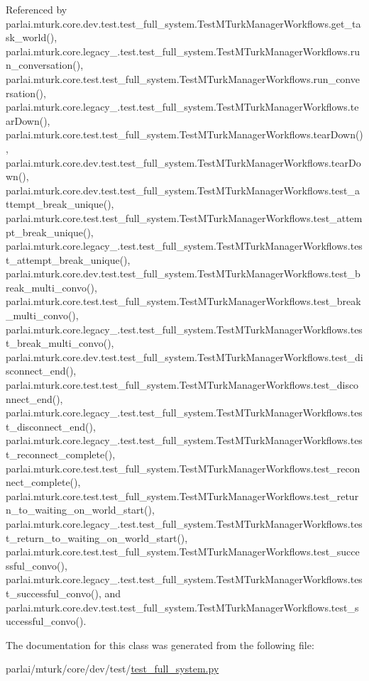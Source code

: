 Referenced by parlai.\+mturk.\+core.\+dev.\+test.\+test\+\_\+full\+\_\+system.\+Test\+M\+Turk\+Manager\+Workflows.\+get\+\_\+task\+\_\+world(), parlai.\+mturk.\+core.\+legacy\+\_.\+test.\+test\+\_\+full\+\_\+system.\+Test\+M\+Turk\+Manager\+Workflows.\+run\+\_\+conversation(), parlai.\+mturk.\+core.\+test.\+test\+\_\+full\+\_\+system.\+Test\+M\+Turk\+Manager\+Workflows.\+run\+\_\+conversation(), parlai.\+mturk.\+core.\+legacy\+\_.\+test.\+test\+\_\+full\+\_\+system.\+Test\+M\+Turk\+Manager\+Workflows.\+tear\+Down(), parlai.\+mturk.\+core.\+test.\+test\+\_\+full\+\_\+system.\+Test\+M\+Turk\+Manager\+Workflows.\+tear\+Down(), parlai.\+mturk.\+core.\+dev.\+test.\+test\+\_\+full\+\_\+system.\+Test\+M\+Turk\+Manager\+Workflows.\+tear\+Down(), parlai.\+mturk.\+core.\+dev.\+test.\+test\+\_\+full\+\_\+system.\+Test\+M\+Turk\+Manager\+Workflows.\+test\+\_\+attempt\+\_\+break\+\_\+unique(), parlai.\+mturk.\+core.\+test.\+test\+\_\+full\+\_\+system.\+Test\+M\+Turk\+Manager\+Workflows.\+test\+\_\+attempt\+\_\+break\+\_\+unique(), parlai.\+mturk.\+core.\+legacy\+\_.\+test.\+test\+\_\+full\+\_\+system.\+Test\+M\+Turk\+Manager\+Workflows.\+test\+\_\+attempt\+\_\+break\+\_\+unique(), parlai.\+mturk.\+core.\+dev.\+test.\+test\+\_\+full\+\_\+system.\+Test\+M\+Turk\+Manager\+Workflows.\+test\+\_\+break\+\_\+multi\+\_\+convo(), parlai.\+mturk.\+core.\+test.\+test\+\_\+full\+\_\+system.\+Test\+M\+Turk\+Manager\+Workflows.\+test\+\_\+break\+\_\+multi\+\_\+convo(), parlai.\+mturk.\+core.\+legacy\+\_.\+test.\+test\+\_\+full\+\_\+system.\+Test\+M\+Turk\+Manager\+Workflows.\+test\+\_\+break\+\_\+multi\+\_\+convo(), parlai.\+mturk.\+core.\+dev.\+test.\+test\+\_\+full\+\_\+system.\+Test\+M\+Turk\+Manager\+Workflows.\+test\+\_\+disconnect\+\_\+end(), parlai.\+mturk.\+core.\+test.\+test\+\_\+full\+\_\+system.\+Test\+M\+Turk\+Manager\+Workflows.\+test\+\_\+disconnect\+\_\+end(), parlai.\+mturk.\+core.\+legacy\+\_.\+test.\+test\+\_\+full\+\_\+system.\+Test\+M\+Turk\+Manager\+Workflows.\+test\+\_\+disconnect\+\_\+end(), parlai.\+mturk.\+core.\+legacy\+\_.\+test.\+test\+\_\+full\+\_\+system.\+Test\+M\+Turk\+Manager\+Workflows.\+test\+\_\+reconnect\+\_\+complete(), parlai.\+mturk.\+core.\+test.\+test\+\_\+full\+\_\+system.\+Test\+M\+Turk\+Manager\+Workflows.\+test\+\_\+reconnect\+\_\+complete(), parlai.\+mturk.\+core.\+test.\+test\+\_\+full\+\_\+system.\+Test\+M\+Turk\+Manager\+Workflows.\+test\+\_\+return\+\_\+to\+\_\+waiting\+\_\+on\+\_\+world\+\_\+start(), parlai.\+mturk.\+core.\+legacy\+\_.\+test.\+test\+\_\+full\+\_\+system.\+Test\+M\+Turk\+Manager\+Workflows.\+test\+\_\+return\+\_\+to\+\_\+waiting\+\_\+on\+\_\+world\+\_\+start(), parlai.\+mturk.\+core.\+test.\+test\+\_\+full\+\_\+system.\+Test\+M\+Turk\+Manager\+Workflows.\+test\+\_\+successful\+\_\+convo(), parlai.\+mturk.\+core.\+legacy\+\_.\+test.\+test\+\_\+full\+\_\+system.\+Test\+M\+Turk\+Manager\+Workflows.\+test\+\_\+successful\+\_\+convo(), and parlai.\+mturk.\+core.\+dev.\+test.\+test\+\_\+full\+\_\+system.\+Test\+M\+Turk\+Manager\+Workflows.\+test\+\_\+successful\+\_\+convo().



The documentation for this class was generated from the following file\+:\begin{DoxyCompactItemize}
\item 
parlai/mturk/core/dev/test/\hyperlink{dev_2test_2test__full__system_8py}{test\+\_\+full\+\_\+system.\+py}\end{DoxyCompactItemize}
